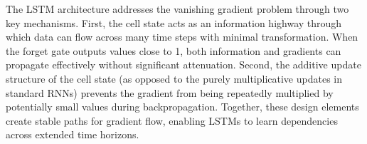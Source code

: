 The LSTM architecture addresses the vanishing gradient problem through two key mechanisms. First, the cell state acts as an information highway through which data can flow across many time steps with minimal transformation. When the forget gate outputs values close to 1, both information and gradients can propagate effectively without significant attenuation. Second, the additive update structure of the cell state (as opposed to the purely multiplicative updates in standard RNNs) prevents the gradient from being repeatedly multiplied by potentially small values during backpropagation. Together, these design elements create stable paths for gradient flow, enabling LSTMs to learn dependencies across extended time horizons.
